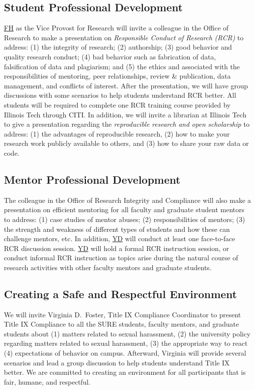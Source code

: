 \documentclass[11pt]{NSFamsart}
\newcommand{\FH}{\hyperlink{FHlink}{FH}\xspace}
\newcommand{\YD}{\hyperlink{YDlink}{YD}\xspace}
\begin{document}
\subsection{Student Professional Development}
\FH as the Vice Provost for Research will invite a colleague in the  Office of Research to make a presentation on
\emph{Responsible Conduct of Research (RCR)} to address: (1) the integrity of research; (2) authorship;  (3) good behavior
and quality research conduct; (4) bad behavior such as fabrication of data, falsification of data and
plagiarism; and (5) the ethics and associated with the responsibilities of mentoring, peer relationships, review
\& publication, data management, and conflicts of interest. After the presentation, we will have group discussions with some scenarios to help students understand RCR better.
All students will be required to complete one RCR training course provided by Illinois Tech through CITI.  In addition, we will invite a librarian at Illinois Tech to give a presentation regarding the \emph{reproducible research and open scholarship} to address: (1) the advantages of  reproducible research, (2) how to make your research work publicly available to others, and
(3) how to share your raw data or code.


 \subsection{Mentor Professional Development}
The colleague in the Office of Research Integrity and Compliance will also make a presentation on efficient mentoring for all faculty and graduate student mentors to address: (1) case studies
of mentor abuses; (2) responsibilities of mentors; (3) the strength and weakness of different types of
students and how these can challenge mentors, etc. In addition, \YD will conduct at least one face-to-face RCR discussion session. \YD will hold a formal RCR instruction session, or conduct informal RCR instruction as topics arise during the natural course of research activities with other faculty mentors and graduate students. 

\subsection{Creating a Safe and Respectful Environment} 
We will invite Virginia D.\ Foster, Title IX Compliance Coordinator to present Title IX Compliance to all the SURE students, faculty mentors, and graduate students about
(1) matters related to sexual harassment,
(2) the university policy regarding matters related to sexual harassment,
(3) the appropriate way to react
(4) expectations of behavior on campus. Afterward, Virginia will provide several scenarios and lead a group discussion to help students understand Title IX better. We are committed to creating an environment for all participants that is fair, humane, and respectful.
\end{document}
